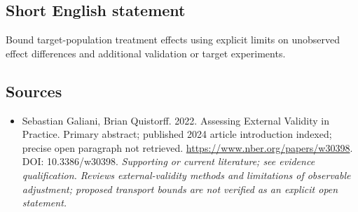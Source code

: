 \documentclass[11pt]{article}
\begin{document}
\subsection{Short English statement}
Bound target-population treatment effects using explicit limits on unobserved effect differences and additional validation or target experiments.

\subsection{Sources}
\begin{itemize}\raggedright
\item[\textnormal{[S1]}]\hypertarget{source:30007702:1}{} Sebastian Galiani, Brian Quistorff. 2022. Assessing External Validity in Practice. Primary abstract; published 2024 article introduction indexed; precise open paragraph not retrieved.
\url{https://www.nber.org/papers/w30398}.
DOI: 10.3386/w30398.
{\small\textit{Supporting or current literature; see evidence qualification. Reviews external-validity methods and limitations of observable adjustment; proposed transport bounds are not verified as an explicit open statement.}}
\end{itemize}
\end{document}
